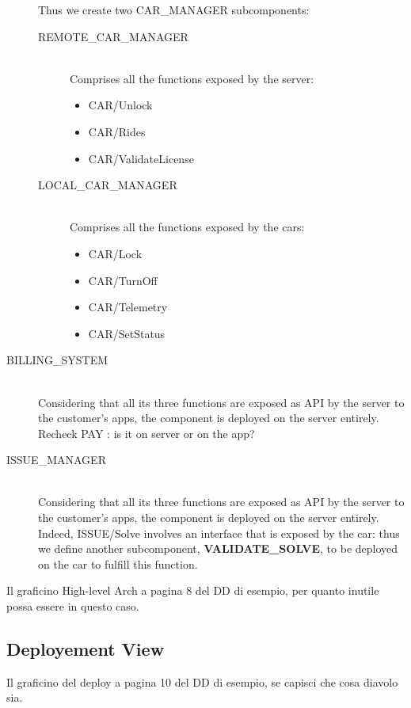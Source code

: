 \documentclass[11pt]{article} %
\begin{document}
\begin{description}
Thus we create two CAR\_MANAGER subcomponents:
	\begin{description}
		\item[REMOTE\_CAR\_MANAGER] \hfill \\ Comprises all the functions exposed by the server:
		\begin{itemize}
			\item CAR/Unlock
			\item CAR/Rides
			\item CAR/ValidateLicense
		\end{itemize}
		\item[LOCAL\_CAR\_MANAGER] \hfill \\ Comprises all the functions exposed by the cars:
		\begin{itemize}
			\item CAR/Lock
			\item CAR/TurnOff
			\item CAR/Telemetry
			\item CAR/SetStatus
		\end{itemize}
	\end{description}

	\item[BILLING\_SYSTEM] \hfill \\
	Considering that all its three functions are exposed as API by the server to the customer's apps, the component is deployed on the server entirely. {\color{red} {Recheck PAY : is it on server or on the app?}}

	\item[ISSUE\_MANAGER] \hfill \\
	Considering that all its three functions are exposed as API by the server to the customer's apps, the component is deployed on the server entirely. \\
	Indeed, ISSUE/Solve involves an interface that is exposed by the car: thus we define another subcomponent, \textbf{VALIDATE\_SOLVE}, to be deployed on the car to fulfill this function.


\end{description}
{\color{blue} {Il graficino High-level Arch a pagina 8 del DD di esempio, per quanto inutile possa essere in questo caso.}}

\subsection{Deployement View}
{\color{blue} {Il graficino del deploy a pagina 10 del DD di esempio, se capisci che cosa diavolo sia.}}
\end{document}

